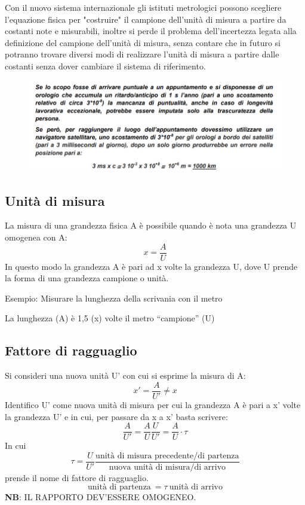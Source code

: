 \documentclass[a4paper, 15pt]{article}
\begin{document}
\begin{adjustwidth}{2in}{}
	Con il nuovo sistema internazionale gli istituti metrologici possono scegliere l'equazione fisica per "costruire" il campione dell'unità di misura a partire da costanti note e misurabili, inoltre si perde il problema dell’incertezza legata alla definizione del campione dell’unità di misura, senza contare che in futuro si potranno trovare diversi modi di realizzare l’unità di misura a partire dalle costanti senza dover cambiare il sistema di riferimento. 
	
\begin{figure}[H]
	\centering
	\includegraphics[width=0.5\linewidth]{fig/screenshot003}
	\label{fig:screenshot003}
\end{figure}
\end{adjustwidth}
\newpage
\subsection{Unità di misura} 
\begin{adjustwidth}{2in}{}
	La misura di una grandezza fisica A è possibile quando è nota una grandezza
	U omogenea con A:
	\[x = \dfrac{A}{U}\]
	In questo modo la grandezza A è pari ad x volte la grandezza U, dove U prende la forma di una grandezza campione o unità.
	
	Esempio: Misurare la lunghezza della scrivania con il metro
	
	La lunghezza (A) è 1,5 (x) volte il metro “campione” (U)
	
\subsection{Fattore di ragguaglio} 
	Si consideri una nuova unità U' con cui si esprime la misura di A: 
	\[ x' = \dfrac{A}{U'} \ne x\]
	Identifico U' come nuova unità di misura per cui la grandezza A è pari a x' volte la grandezza U' e in cui, per passare da x a x' basta scrivere:
	\[\dfrac{A}{U'} = \dfrac{A}{U} \dfrac{U}{U'} = \dfrac{A}{U} \cdot \tau \]
	In cui\[ \tau= \dfrac{U}{U'} \dfrac{\text{unità di misura precedente/di partenza}}{\text{nuova unità di misura/di arrivo}}\]  prende il nome di fattore di ragguaglio. 
	\[ \text{unità di partenza} ~ = \tau ~ \text{unità di arrivo}\]\newline
	\textbf{NB}: IL RAPPORTO DEV'ESSERE OMOGENEO. \newline
\end{adjustwidth}
\newpage	
\end{document}
